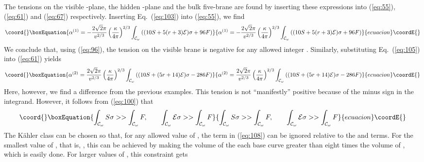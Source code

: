 \documentclass[a4paper,12pt]{article}
\numberwithin{equation}{section}
\theoremstyle{plain}
\begin{document}
The tensions on the visible \coordHE{}-plane, the hidden \coordHE{}-plane and the bulk
five-brane are found by inserting these expressions into (\ref{eq:55}),
(\ref{eq:61}) and (\ref{eq:67}) respectively. Inserting Eq.~(\ref{eq:103}) 
into (\ref{eq:55}), we find 
%
\begin{equation}\coord{}\boxEquation{
\alpha^{(1)}=-\frac{2\sqrt{2}\pi}{v^{2/3}}\left(\frac{\kappa}{4\pi}\right)^{2/3}
\int_{{\cal{C}}_{\omega}}{((10S+5(r+3){\cal{E}})\sigma+96F)}
\label{eq:107}
}{
\alpha^{(1)}=-\frac{2\sqrt{2}\pi}{v^{2/3}}\left(\frac{\kappa}{4\pi}\right)^{2/3}
\int_{{\cal{C}}_{\omega}}{((10S+5(r+3){\cal{E}})\sigma+96F)}
}{ecuacion}\coordE{}\end{equation}
%
We conclude that, using (\ref{eq:96}), the tension on the visible brane is
negative for any allowed integer \coordHE{}. Similarly, substituting Eq.~(\ref{eq:105}) into (\ref{eq:61}) yields
%
\begin{equation}\coord{}\boxEquation{
\alpha^{(2)}=\frac{2\sqrt{2}\pi}{v^{2/3}}\left(\frac{\kappa}{4\pi}\right)^{2/3}
\int_{{\cal{C}}_{\omega}}{((10S+(5r+14){\cal{E}})\sigma-286F)}
\label{eq:108}
}{
\alpha^{(2)}=\frac{2\sqrt{2}\pi}{v^{2/3}}\left(\frac{\kappa}{4\pi}\right)^{2/3}
\int_{{\cal{C}}_{\omega}}{((10S+(5r+14){\cal{E}})\sigma-286F)}
}{ecuacion}\coordE{}\end{equation}
%
Here, however, we find a difference from the previous examples. This tension
is not ``manifestly'' positive because of the minus sign in the integrand.
However, it follows from (\ref{eq:100}) that
%
\begin{equation}\coord{}\boxEquation{
\int_{{\cal{C}}_{\omega}}{S\sigma}>>\int_{{\cal{C}}_{\omega}}{F}, \qquad
\int_{{\cal{C}}_{\omega}}{{\cal{E}}\sigma}>>\int_{{\cal{C}}_{\omega}}{F}
\label{eq:109}
}{
\int_{{\cal{C}}_{\omega}}{S\sigma}>>\int_{{\cal{C}}_{\omega}}{F}, \qquad
\int_{{\cal{C}}_{\omega}}{{\cal{E}}\sigma}>>\int_{{\cal{C}}_{\omega}}{F}
}{ecuacion}\coordE{}\end{equation}
%
The K\"{a}hler class can be chosen so that, for any allowed value of \coordHE{}, the
\coordHE{} term in (\ref{eq:108}) can be ignored relative to the \coordHE{} and \coordHE{}
terms. For the smallest value of \coordHE{}, that is, \coordHE{}, this can be achieved by making
the volume of the each base curve greater than eight times the volume of \coordHE{},
which is easily done. For larger values of \coordHE{}, this constraint gets
\end{document}
